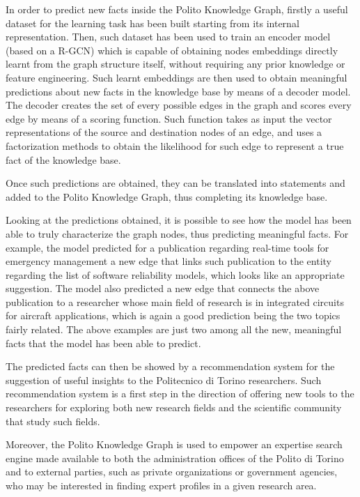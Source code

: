 \documentclass[english, 12pt]{article}
\begin{document}
In order to predict new facts inside the Polito Knowledge Graph, firstly a
useful dataset for the learning task has been built starting from its
internal representation.
Then, such dataset has been used to train an encoder model (based on a
R-GCN) which is capable of obtaining nodes embeddings directly
learnt from the graph structure itself, without requiring any prior knowledge or
feature engineering.
Such learnt embeddings are then used to obtain meaningful
predictions about new facts in the knowledge base by means of a decoder model.
The decoder creates the set of every possible edges in the graph and scores
every edge by means of a scoring function.
Such function takes as input the vector representations of the source and
destination nodes of an edge, and uses a factorization methods to obtain
the likelihood for such edge to represent a true fact of the knowledge base.

Once such predictions are obtained, they can be translated into statements
and added to the Polito Knowledge Graph, thus completing its knowledge base.

Looking at the predictions obtained, it is possible to see how the model has
been able to truly characterize the graph nodes, thus predicting meaningful
facts.
For example, the model predicted for a publication regarding
real-time tools for emergency management a new edge that
links such publication to the entity regarding the list of software reliability
models, which looks like an appropriate suggestion.
The model also predicted a new edge that connects the above publication to a
researcher whose main field of research is in integrated circuits for aircraft
applications, which is again a good prediction being the two topics fairly
related.
The above examples are just two among all the new, meaningful facts that
the model has been able to predict.

The predicted facts can then be showed by a recommendation system for the
suggestion of useful insights to the Politecnico di Torino researchers.
Such recommendation system is a first step in the direction of
offering new tools to the researchers for exploring both new research fields
and the scientific community that study such fields.

Moreover, the Polito Knowledge Graph is used to empower
an expertise search engine made available to both the administration offices
of the Polito di Torino and to external parties, such as private organizations
or government agencies, who may be interested in finding expert profiles in a
given research area.
\end{document}
